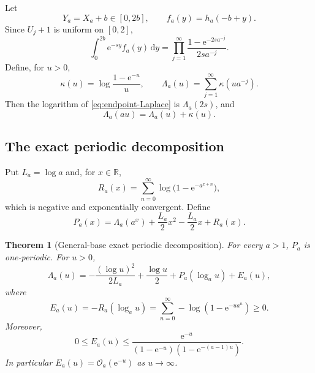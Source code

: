 \documentclass[11pt,oneside]{article}
\newtheorem{theorem}{Theorem}[section]
\theoremstyle{definition}
\theoremstyle{remark}
\newcommand{\R}{\mathbb R}
\newcommand{\e}{\mathrm e}
\newcommand{\dd}{\,\mathrm d}
\newcommand{\bigO}{\mathcal O}
\begin{document}
Let
\begin{equation}
 Y_a=X_a+b\in[0,2b],
 \qquad f_a(y)=h_a(-b+y).
 \label{eq:endpoint-shift}
\end{equation}
Since $U_j+1$ is uniform on $[0,2]$,
\begin{equation}
 \int_0^{2b}\e^{-sy}f_a(y)\dd y
 =\prod_{j=1}^{\infty}
 \frac{1-\e^{-2sa^{-j}}}{2sa^{-j}}.
 \label{eq:endpoint-Laplace}
\end{equation}
Define, for $u>0$,
\begin{equation}
 \kappa(u)=\log\frac{1-\e^{-u}}{u},
 \qquad
 \Lambda_a(u)=\sum_{j=1}^{\infty}\kappa(ua^{-j}).
 \label{eq:Lambda-a}
\end{equation}
Then the logarithm of \eqref{eq:endpoint-Laplace} is $\Lambda_a(2s)$, and
\begin{equation}
 \Lambda_a(au)=\Lambda_a(u)+\kappa(u).
 \label{eq:Lambda-dilation}
\end{equation}

\subsection{The exact periodic decomposition}

Put $L_a=\log a$ and, for $x\in\R$,
\begin{equation}
 R_a(x)=\sum_{n=0}^{\infty}\log\bigl(1-\e^{-a^{x+n}}\bigr),
 \label{eq:Rax}
\end{equation}
which is negative and exponentially convergent.  Define
\begin{equation}
 P_a(x)=\Lambda_a(a^x)+\frac{L_a}{2}x^2-\frac{L_a}{2}x+R_a(x).
 \label{eq:Pa-def}
\end{equation}

\begin{theorem}[General-base exact periodic decomposition]
\label{thm:general-periodic}
For every $a>1$, $P_a$ is one-periodic.  For $u>0$,
\begin{equation}
 \boxed{\quad
 \Lambda_a(u)=
 -\frac{(\log u)^2}{2L_a}+\frac{\log u}{2}
 +P_a(\log_a u)+E_a(u),
 \quad}
 \label{eq:general-exact-Laplace}
\end{equation}
where
\begin{equation}
 E_a(u)=-R_a(\log_a u)
 =\sum_{n=0}^{\infty}-\log(1-\e^{-ua^n})\ge0.
 \label{eq:Ea}
\end{equation}
Moreover,
\begin{equation}
 0\le E_a(u)\le
 \frac{\e^{-u}}{(1-\e^{-u})(1-\e^{-(a-1)u})}.
 \label{eq:Ea-bound}
\end{equation}
In particular $E_a(u)=\bigO_a(\e^{-u})$ as $u\to\infty$.
\end{theorem}
\end{document}
